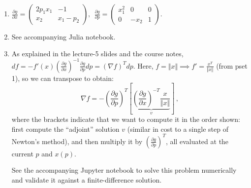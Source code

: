 \documentclass[10pt,oneside]{article}
\begin{document}
\begin{enumerate}
    \item 

     $\frac{\partial g}{\partial x}=
     \begin{pmatrix}
     2p_1x_1 & -1 \\  x_2 & x_1-p_2
     \end{pmatrix},  \ \
      \frac{\partial g}{\partial p}=
       \begin{pmatrix}
     x_1^2 &  0 & 0 \\  0 & -x_2 & 1
     \end{pmatrix}.$
    \item  See accompanying Julia notebook.

    \begin{center}
%     
\end{center}


 \item  As explained in the lecture-5 slides and the course notes, $df = -f'(x) \left( \frac{\partial g}{\partial x} \right)^{-1} \frac{\partial g}{\partial p} dp = (\nabla f)^T dp$.  Here, $f = \Vert x \Vert \implies f' = \frac{x^T}{\Vert x \Vert}$ (from pset 1), so we can transpose to obtain:
 $$
 \boxed{\nabla f = -\left(\frac{\partial g}{\partial p}\right)^T \left[ \underbrace{ \left(\frac{\partial g}{\partial x} \right)^{-T} \frac{x}{\Vert x \Vert}}_v \right] }\, ,
 $$
 where the brackets indicate that we want to compute it in the order shown: first compute the ``adjoint'' solution $v$ (similar in cost to a single step of Newton's method), and then multiply it by $\left(\frac{\partial g}{\partial p}\right)^T $, all evaluated at the current $p$ and $x(p)$.

 See the accompanying Jupyter notebook to solve this problem numerically and validate it against a finite-difference solution.


\end{enumerate}
\end{document}

